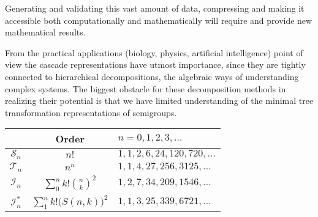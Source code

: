 \documentclass{amsart}
\newcommand{\T}{\mathcal T}
\newcommand{\I}{\mathcal I}
\newcommand{\cS}{\mathcal S}
\newcommand{\fB}{\mathfrak B}
\newcommand{\fJ}{\mathfrak J}
\begin{document}
Generating  and validating this vast amount of data, compressing and making it accessible both computationally and mathematically  will require and provide new mathematical results.    

From the practical applications (biology, physics, artificial intelligence) point of view the cascade representations have utmost importance, since they are tightly connected to hierarchical decompositions, the algebraic ways of understanding complex systems. The biggest obstacle for these decomposition methods in realizing their potential is that we have limited understanding of the minimal tree transformation representations of semigroups. 


\begin{tabular}{|c|c|l|}
\hline
 & Order & $n=0,1,2,3,\ldots$\\ 
\hline 
$\cS_n$& $n!$ & $1, 1, 2, 6, 24, 120, 720,\ldots$\\
\hline 
$\T_n$& $n^n$ & $1,1,4,27,256,3125,\ldots$\\
\hline
$\I_n$&$\sum_0^n k!{n\choose k}^2$ &$1, 2, 7, 34, 209, 1546,\ldots$\\
\hline
$\I_n^*$& $\sum_1^n k!\big(S(n, k)\big)^2$&$1, 1, 3, 25, 339, 6721,\ldots$\\
\hline
\end{tabular}
\end{document}
